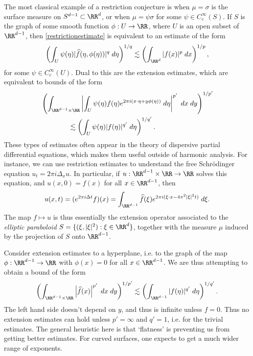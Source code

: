 The most classical example of a restriction conjecture is when $\mu = \sigma$ is the surface measure on $S^{d-1} \subset \RR^d$, or when $\mu = \psi \sigma$ for some $\psi \in C_c^\infty(S)$. If $S$ is the graph of some smooth function $\phi: U \to \RR$, where $U$ is an open subset of $\RR^{d-1}$, then \eqref{restrictionestimate} is equivalent to an estimate of the form
%
\[ \left( \int_U \psi(\eta) |\widehat{f}(\eta,\phi(\eta))|^q\; d\eta \right)^{1/q} \lesssim \left( \int_{\RR^d} |f(x)|^p\; dx \right)^{1/p}, \]
%
for some $\psi \in C_c^\infty(U)$. Dual to this are the extension estimates, which are equivalent to bounds of the form
%
\begin{align*}
  &\left( \int_{\RR^{d-1} \times \RR} \left| \int_U \psi(\eta) f(\eta) e^{2 \pi i (x \cdot \eta + y \phi(\eta))}\; d\eta \right|^{p'}\; dx\; dy \right)^{1/p'}\\
  &\quad\quad\quad\quad\lesssim \left( \int_U \psi(\eta) |f(\eta)|^{q'}\; d\eta \right)^{1/q'}.
\end{align*}
%
These types of estimates often appear in the theory of dispersive partial differential equations, which makes them useful outside of harmonic analysis.  For instance, we can use restriction estimates to understand the free Schr\"{o}dinger equation $u_t = 2 \pi i \Delta_x u$. In particular, if $u: \RR^{d-1} \times \RR \to \RR$ solves this equation, and $u(x,0) = f(x)$ for all $x \in \RR^{d-1}$, then
\[ u(x,t) = (e^{2 \pi i \Delta t} f)(x) = \int_{\RR^{d-1}} \widehat{f}(\xi) e^{2 \pi i (\xi \cdot x - 4\pi^2 |\xi|^2 t)}\; d\xi. \]
%
The map $f \mapsto u$ is thus essentially the extension operator associated to the \emph{elliptic paraboloid} $S = \{ (\xi,|\xi|^2) : \xi \in \RR^d \}$, together with the measure $\mu$ induced by the projection of $S$ onto $\RR^{d-1}$.

\begin{example}
  Consider extension estimates to a hyperplane, i.e. to the graph of the map $\phi: \RR^{d-1} \to \RR$ with $\phi(x) = 0$ for all $x \in \RR^{d-1}$. We are thus attempting to obtain a bound of the form
  \[ \left( \int_{\RR^{d-1} \times \RR} \left| \widehat{f}(x) \right|^{p'}\; dx\; dy \right)^{1/p'} \lesssim \left( \int_{\RR^{d-1}} |f(\eta)|^{q'}\; d\eta \right)^{1/q'}. \]
  The left hand side doesn't depend on $y$, and thus is infinite unless $f = 0$. Thus no extension estimates can hold unless $p' = \infty$ and $q' = 1$, i.e. for the trivial estimates. The general heuristic here is that `flatness' is preventing us from getting better estimates. For curved surfaces, one expects to get a much wider range of exponents.
\end{example}

